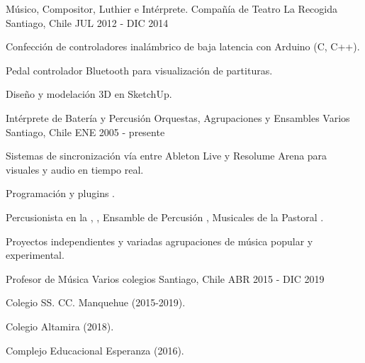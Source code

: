 \begin{cventries}
%
  \cventry
    {Músico, Compositor, Luthier e Intérprete.}
    {Compañía de Teatro La Recogida}
    {Santiago, Chile}
    {JUL 2012 - DIC 2014}
    {
      \begin{cvitems} %
        \item {Confección de controladores  inalámbrico de baja latencia con Arduino (C, C++).}
        \item {Pedal controlador Bluetooth para visualización de partituras.}
        \item {Diseño y modelación 3D en SketchUp.}
      \end{cvitems}
    }

  \cventry
    {Intérprete de Batería y Percusión}
    {Orquestas, Agrupaciones y Ensambles Varios}
    {Santiago, Chile}
    {ENE 2005 - presente}
    {
    	\begin{cvitems} %
    	  \item {Sistemas de sincronización  vía  entre Ableton Live y Resolume Arena para visuales y audio  en tiempo real.}
    	  \item {Programación  y plugins .}
        \item {Percusionista en la , , Ensamble de Percusión , Musicales de la Pastoral .}
        \item {Proyectos independientes y variadas agrupaciones de música popular y experimental.}
      \end{cvitems}
		}

  \cventry
    {Profesor de Música} %
    {Varios colegios} %
    {Santiago, Chile} %
    {ABR 2015 - DIC 2019} %
    {
      \begin{cvitems} %
        \item {Colegio SS. CC. Manquehue (2015-2019).}
        \item {Colegio Altamira (2018).}
        \item {Complejo Educacional Esperanza (2016).}
      \end{cvitems}
    }

\end{cventries}

